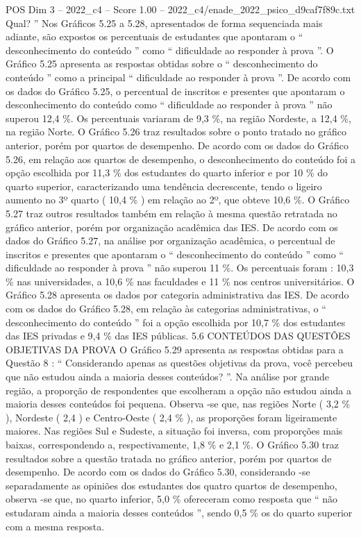 \begin{textsample}{POS Dim 3 – 2022\_c4 – Score 1.00 – 2022\_c4/enade\_2022\_psico\_d9caf7f89c.txt}
Qual? ” Nos Gráficos 5.25 a 5.28, apresentados de forma sequenciada mais adiante, são expostos os percentuais de estudantes que apontaram o “ desconhecimento do conteúdo ” como “ dificuldade ao responder à prova ”.
O Gráfico 5.25 apresenta as respostas obtidas sobre o “ desconhecimento do conteúdo ” como a principal “ dificuldade ao responder à prova ”.
De acordo com os dados do Gráfico 5.25, o percentual de inscritos e presentes que apontaram o desconhecimento do conteúdo como “ dificuldade ao responder à prova ” não superou 12,4 \%.
Os percentuais variaram de 9,3 \%, na região Nordeste, a 12,4 \%, na região Norte.
O Gráfico 5.26 traz resultados sobre o ponto tratado no gráfico anterior, porém por quartos de desempenho.
De acordo com os dados do Gráfico 5.26, em relação aos quartos de desempenho, o desconhecimento do conteúdo foi a opção escolhida por 11,3 \% dos estudantes do quarto inferior e por 10 \% do quarto superior, caracterizando uma tendência decrescente, tendo o ligeiro aumento no 3º quarto ( 10,4 \% ) em relação ao 2º, que obteve 10,6 \%.
O Gráfico 5.27 traz outros resultados também em relação à mesma questão retratada no gráfico anterior, porém por organização acadêmica das IES.
De acordo com os dados do Gráfico 5.27, na análise por organização acadêmica, o percentual de inscritos e presentes que apontaram o “ desconhecimento do conteúdo ” como “ dificuldade ao responder à prova ” não superou 11 \%.
Os percentuais foram : 10,3 \% nas universidades, a 10,6 \% nas faculdades e 11 \% nos centros universitários.
O Gráfico 5.28 apresenta os dados por categoria administrativa das IES.
De acordo com os dados do Gráfico 5.28, em relação às categorias administrativas, o “ desconhecimento do conteúdo ” foi a opção escolhida por 10,7 \% dos estudantes das IES privadas e 9,4 \% das IES públicas. 5.6 CONTEÚDOS DAS QUESTÕES OBJETIVAS DA PROVA O Gráfico 5.29 apresenta as respostas obtidas para a Questão 8 : “ Considerando apenas as questões objetivas da prova, você percebeu que não estudou ainda a maioria desses conteúdos? ”.
Na análise por grande região, a proporção de respondentes que escolheram a opção não estudou ainda a maioria desses conteúdos foi pequena.
Observa -se que, nas regiões Norte ( 3,2 \% ), Nordeste ( 2,4 ) e Centro-Oeste ( 2,4 \% ), as proporções foram ligeiramente maiores.
Nas regiões Sul e Sudeste, a situação foi inversa, com proporções mais baixas, correspondendo a, respectivamente, 1,8 \% e 2,1 \%.
O Gráfico 5.30 traz resultados sobre a questão tratada no gráfico anterior, porém por quartos de desempenho.
De acordo com os dados do Gráfico 5.30, considerando -se separadamente as opiniões dos estudantes dos quatro quartos de desempenho, observa -se que, no quarto inferior, 5,0 \% ofereceram como resposta que “ não estudaram ainda a maioria desses conteúdos ”, sendo 0,5 \% os do quarto superior com a mesma resposta.

\end{textsample}
